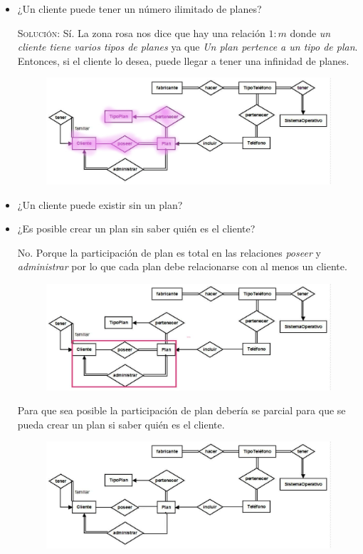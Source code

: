 \documentclass[letterpaper,11pt]{article}
\begin{document}
\begin{itemize}
    \item ¿Un cliente puede tener un número ilimitado de planes?

    \textsc{Solución:} Sí. La zona rosa nos dice que hay una relación $1:m$ 
    donde \textit{un cliente tiene varios tipos de planes} ya que 
    \textit{Un plan pertence a un tipo de plan}. Entonces, si el 
    cliente lo desea, puede llegar a tener una infinidad de planes.

    \begin{figure}[h]
        \centering
        \includegraphics[scale=0.4]{./imagenes/modelo1.jpg}
    \end{figure}
    
    \item ¿Un cliente puede existir sin un plan?
    
    \item ¿Es posible crear un plan sin saber quién es el cliente?
    
    No. Porque la participación de plan es total en las relaciones \textit{poseer} 
    y \textit{administrar} por lo que cada plan debe relacionarse con al menos 
    un cliente. 
    \begin{figure}[H]
        \centering
        \includegraphics[scale=0.4]{./imagenes/modelo3a.jpg}
    \end{figure}
    Para que sea posible la participación de plan debería se parcial para que 
    se pueda crear un plan si saber quién es el cliente.
    \begin{figure}[H]
        \centering
        \includegraphics[scale=0.4]{./imagenes/modelo3b.jpg}
    \end{figure}


\end{itemize}
\end{document}
